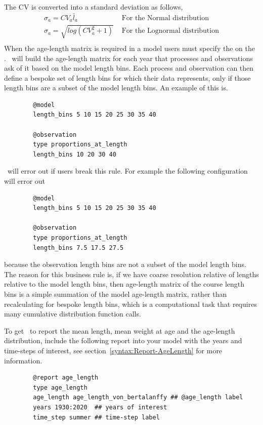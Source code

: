 %
The CV is converted into a standard deviation as follows,
\begin{align*}
	\sigma_a = CV_a \bar{l}_a & \text{ For the Normal distribution}\\
	\sigma_a = \sqrt{log(CV_a^2 + 1)} & \text{ For the Lognormal distribution}\\	
\end{align*}
%
When the age-length matrix is required in a model users must specify the  on the . \CNAME\ will build the age-length matrix for each year that processes and observations ask of it based on the model length bins. Each process and observation can then define a bespoke set of length bins for which their data represents, only if those length bins are a subset of the model length bins. An example of this is.

{\small{\begin{verbatim}
		@model
		length_bins 5 10 15 20 25 30 35 40 
		
		@observation 
		type proportions_at_length
		length_bins 10 20 30 40
\end{verbatim}}}
\CNAME\ will error out if users break this rule. For example the following configuration will error out
{\small{\begin{verbatim}
		@model
		length_bins 5 10 15 20 25 30 35 40 
		
		@observation 
		type proportions_at_length
		length_bins 7.5 17.5 27.5
		\end{verbatim}}}
because the observation length bins are not a subset of the model length bins. The reason for this business rule is, if we have coarse resolution relative of lengths relative to the model length bins, then age-length matrix of the course length bins is a simple summation of the model age-length matrix, rather than recalculating for bespoke length bins, which is a computational task that requires many cumulative distribution function calls.

To get \CNAME\ to report the mean length, mean weight at age and the age-length distribution, include the following report into your model with the years and time-steps of interest, see section~\ref{syntax:Report-AgeLength} for more information.
{\small{\begin{verbatim}
		@report age_length
		type age_length 
		age_length age_length_von_bertalanffy ## @age_length label
		years 1930:2020  ## years of interest
		time_step summer ## time-step label
		\end{verbatim}}}
	
